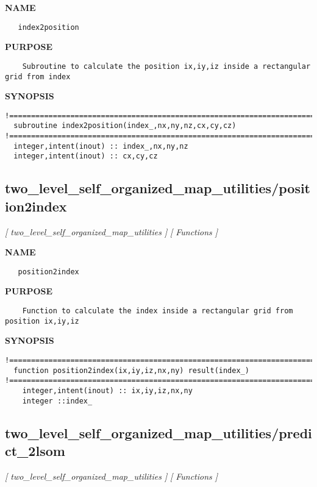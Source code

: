 \documentclass{article}
\begin{document}
\label{ch:robo70}
\label{ch:two_level_self_organized_map_utilities_index2position}
\textbf{NAME}
\begin{verbatim}
   index2position
\end{verbatim}
\textbf{PURPOSE}
\begin{verbatim}
    Subroutine to calculate the position ix,iy,iz inside a rectangular grid from index
\end{verbatim}
\textbf{SYNOPSIS}
\begin{verbatim}
!========================================================================================
  subroutine index2position(index_,nx,ny,nz,cx,cy,cz)
!========================================================================================
  integer,intent(inout) :: index_,nx,ny,nz
  integer,intent(inout) :: cx,cy,cz
\end{verbatim}
\newpage
\subsection{two\_level\_self\_organized\_map\_utilities/position2index}
\textsl{[ two\_level\_self\_organized\_map\_utilities ]}
\textsl{[ Functions ]}

\label{ch:robo71}
\label{ch:two_level_self_organized_map_utilities_position2index}
\textbf{NAME}
\begin{verbatim}
   position2index
\end{verbatim}
\textbf{PURPOSE}
\begin{verbatim}
    Function to calculate the index inside a rectangular grid from position ix,iy,iz
\end{verbatim}
\textbf{SYNOPSIS}
\begin{verbatim}
!========================================================================================
  function position2index(ix,iy,iz,nx,ny) result(index_)
!========================================================================================
    integer,intent(inout) :: ix,iy,iz,nx,ny
    integer ::index_
\end{verbatim}
\newpage
\subsection{two\_level\_self\_organized\_map\_utilities/predict\_2lsom}
\textsl{[ two\_level\_self\_organized\_map\_utilities ]}
\textsl{[ Functions ]}
\end{document}
